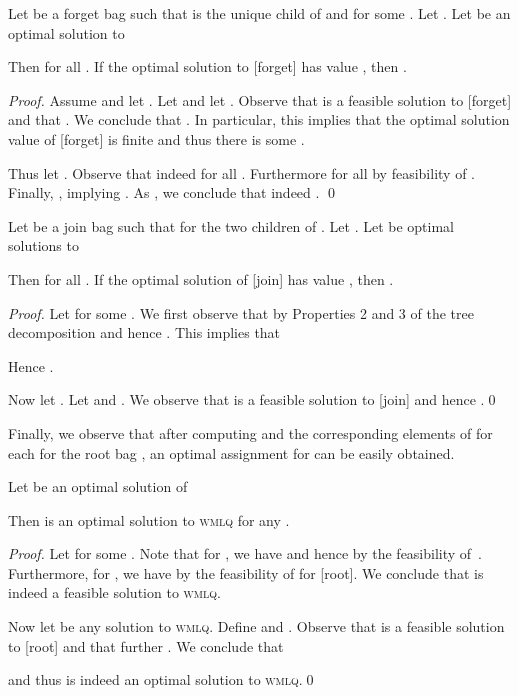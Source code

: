 \documentclass{llncs}
\begin{document}
\begin{lemma}\label{lem:forget}
	Let  be a forget bag such that  is the unique child of  and  for some . Let . 
	Let  be an optimal solution to
	
	Then  for all . If the optimal solution to [forget] has value , then .
\end{lemma}
\begin{proof}
  Assume  and let . Let \mbox{} and let . Observe that  is a feasible solution to [forget] and that . We conclude that . In particular, this implies that the optimal solution value of [forget] is finite and thus there is some \mbox{}.

  Thus let . Observe that indeed  for all . Furthermore  for all  by feasibility of . Finally, , implying . As , we conclude that indeed .
   \qed
\end{proof}

\begin{lemma}\label{lem:join}
	Let  be a join bag such that  for the two children  of .
	Let . Let  be optimal solutions to
	
	Then  for all .
	If the optimal solution of [join] has value , then .
\end{lemma}
\begin{proof}
  Let  for some . We first observe that  by Properties 2 and 3
  of the tree decomposition and hence . This implies that
  
  Hence .
   
  Now let . Let  and . We observe that  is a feasible solution to [join] and hence
   .\qed
\end{proof}

Finally, we observe that after computing  and the corresponding elements of  for each  for the root bag , an optimal assignment for  can be easily obtained.
\begin{lemma}\label{lem:root}
  Let  be an optimal solution of
  
  Then  is an optimal solution to \textsc{wmlq} for any .
\end{lemma}

\begin{proof}
Let  for some . Note that for , we have  and hence  by the feasibility of~. Furthermore, for , we have  by the feasibility of  for [root]. We conclude that  is indeed a feasible solution to \textsc{wmlq}.

Now let  be any solution to \textsc{wmlq}.
Define  and . Observe that  is a feasible solution to [root] and that further .
We conclude that 

and thus  is indeed an optimal solution to \textsc{wmlq}.\qed
\end{proof}
\end{document}
